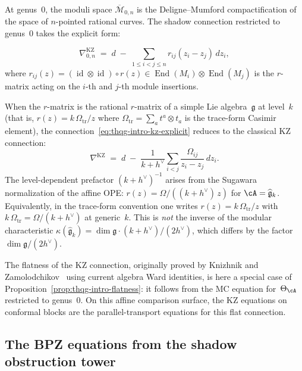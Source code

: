 At genus~$0$, the moduli space $\overline{\mathcal{M}}_{0,n}$ is the
Deligne--Mumford compactification of the space of $n$-pointed rational
curves. The shadow connection restricted to genus~$0$ takes the
explicit form:

\begin{equation}\label{eq:thqg-intro-kz-explicit}
\nabla^{\mathrm{KZ}}_{0,n}
\;=\;
d \;-\; \sum_{1 \le i < j \le n}
r_{ij}(z_i - z_j)\,dz_i,
\end{equation}
where $r_{ij}(z) = (\operatorname{id} \otimes \operatorname{id}) \circ
r(z) \in \operatorname{End}(M_i) \otimes \operatorname{End}(M_j)$ is
the $r$-matrix acting on the $i$-th and $j$-th module insertions.

When the $r$-matrix is the rational $r$-matrix of a simple Lie
algebra~$\mathfrak{g}$ at level~$k$ (that is, $r(z) = k\,\Omega_{\mathrm{tr}}/z$ where
$\Omega_{\mathrm{tr}} = \sum_a t^a \otimes t_a$ is the trace-form
Casimir element), the
connection~\eqref{eq:thqg-intro-kz-explicit} reduces to the
classical KZ connection:
\begin{equation}\label{eq:thqg-intro-kz-classical}
\nabla^{\mathrm{KZ}}
\;=\;
d \;-\; \frac{1}{k + h^\vee}
\sum_{i < j} \frac{\Omega_{ij}}{z_i - z_j}\,dz_i.
\end{equation}
The level-dependent prefactor $(k + h^\vee)^{-1}$ arises from
the Sugawara normalization of the affine OPE:
$r(z) = \Omega / ((k + h^\vee)\,z)$ for
$\cA = \widehat{\mathfrak{g}}_k$. Equivalently, in the trace-form
convention one writes $r(z) = k\,\Omega_{\mathrm{tr}}/z$ with
$k\,\Omega_{\mathrm{tr}} = \Omega/(k+h^\vee)$ at generic~$k$.
This is \emph{not} the
inverse of the modular characteristic
$\kappa(\widehat{\mathfrak{g}}_k)
= \dim\mathfrak{g}\cdot(k + h^\vee)/(2h^\vee)$, which differs
by the factor $\dim\mathfrak{g}/(2h^\vee)$.

The flatness of the KZ connection, originally proved by Knizhnik and
Zamolodchikov~\cite{KZ84} using current algebra Ward identities, is
here a special case of Proposition~\ref{prop:thqg-intro-flatness}: it
follows from the MC equation for~$\Theta_\cA$ restricted to genus~$0$.
On this affine comparison surface, the KZ equations on conformal
blocks are the parallel-transport equations for this flat
connection.

\subsection{The BPZ equations from the shadow obstruction tower}
\label{subsec:thqg-intro-bpz}

